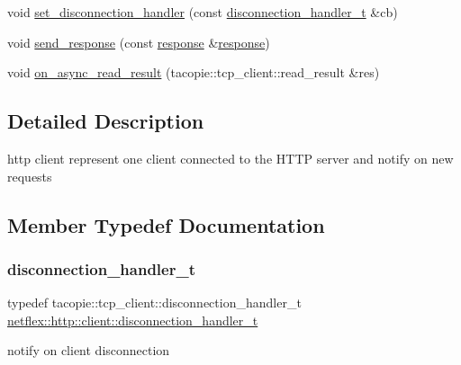 \begin{DoxyCompactItemize}
\item 
void \hyperlink{classnetflex_1_1http_1_1client_a5da02e72625f4e8fbc8e8c64dcaca02a}{set\+\_\+disconnection\+\_\+handler} (const \hyperlink{classnetflex_1_1http_1_1client_acacb8798dcade63c52a674b3f7820fba}{disconnection\+\_\+handler\+\_\+t} \&cb)
\item 
void \hyperlink{classnetflex_1_1http_1_1client_a8b00e06dfa90d8c96f9773ce043d0776}{send\+\_\+response} (const \hyperlink{classnetflex_1_1http_1_1response}{response} \&\hyperlink{classnetflex_1_1http_1_1response}{response})
\item 
void \hyperlink{classnetflex_1_1http_1_1client_ae9fbf1637c4faf451cc9f27148a9498a}{on\+\_\+async\+\_\+read\+\_\+result} (tacopie\+::tcp\+\_\+client\+::read\+\_\+result \&res)
\end{DoxyCompactItemize}


\subsection{Detailed Description}
http client represent one client connected to the H\+T\+TP server and notify on new requests 

\subsection{Member Typedef Documentation}
\mbox{\label{classnetflex_1_1http_1_1client_acacb8798dcade63c52a674b3f7820fba}} 
\subsubsection{\texorpdfstring{disconnection\+\_\+handler\+\_\+t}{disconnection\_handler\_t}}
{\footnotesize\ttfamily typedef tacopie\+::tcp\+\_\+client\+::disconnection\+\_\+handler\+\_\+t \hyperlink{classnetflex_1_1http_1_1client_acacb8798dcade63c52a674b3f7820fba}{netflex\+::http\+::client\+::disconnection\+\_\+handler\+\_\+t}}

notify on client disconnection \mbox{\label{classnetflex_1_1http_1_1client_aeac22a78222d25d3224bf50b8e44fb2d}} 

